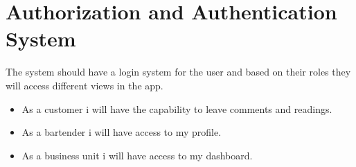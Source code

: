 \documentclass{scrreprt}
\begin{document}




\section{Authorization and Authentication System}
The system should have a login system for the user and based on
their roles they will access different views in the app.
\begin{itemize}
    \item As a customer i will have the capability to leave comments and readings.
    \item As a bartender i will have access to my profile.
    \item As a business unit i will have access to my dashboard.
\end{itemize}
\end{document}
